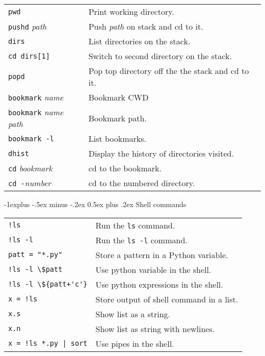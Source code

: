 \documentclass[10pt,landscape]{article}
\makeatletter
\renewcommand{\subsection}{\@startsection{subsection}{2}{0mm}%
                                {-1explus -.5ex minus -.2ex}%
                                {0.5ex plus .2ex}%
                                {\normalfont\normalsize\bfseries}}
\makeatother
\begin{document}
\begin{multicols}{3}
\begin{tabular}{@{}p{\the\MyLen}%
                @{}p{\linewidth-\the\MyLen}@{}}

  \verb!pwd! &  Print working directory.\\
  \verb!pushd! \textit{path} &  Push \textit{path} on stack and cd to it. \\
  \verb!dirs! & List directories on the stack. \\
  \verb!cd dirs[1]! & Switch to second directory on the stack. \\
  \verb!popd! & Pop top directory off the the stack and cd to it.\\
  \verb!bookmark! \textit{name} & Bookmark CWD \\
  \verb!bookmark! \textit{name path}  & Bookmark path. \\
  \verb!bookmark -l!  & List bookmarks. \\
  \verb!dhist! & Display the history of directories visited. \\
  \verb!cd! \textit{bookmark}  & cd to the bookmark. \\
  \verb!cd -!\textit{number} & cd to the numbered directory.

\end{tabular}

\subsection{Shell commands}

\begin{tabular}{@{}p{\the\MyLen}%
                @{}p{\linewidth-\the\MyLen}@{}}

  \verb/!ls/ & Run the \texttt{ls} command.\\
  \verb/!ls -l/ & Run the \texttt{ls -l} command.\\
  \verb/patt = "*.py"/ & Store a pattern in a Python variable.\\
  \verb/!ls -l \$patt/ & Use python variable in the shell.\\
  \verb/!ls -l \${patt+'c'}/ & Use python expressions in the shell.\\
  \verb/x = !ls/ & Store output of shell command in a list.\\
  \verb/x.s/ & Show list as a string.\\
  \verb/x.n/ & Show list as string with newlines.\\
  \verb/x = !ls *.py | sort/ & Use pipes in the shell.\\


\end{tabular}
\end{multicols}
\end{document}

